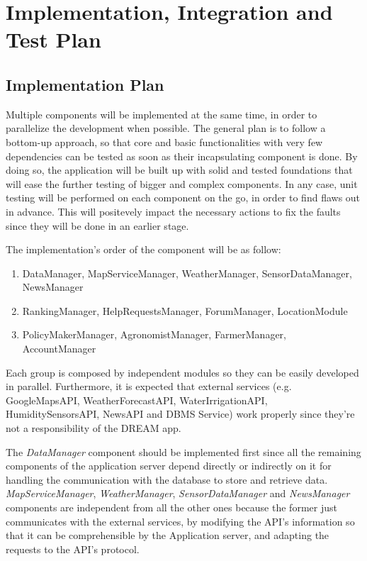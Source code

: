 \documentclass[table, 12pt]{article}
\begin{document}
\section{Implementation, Integration and Test Plan}
\subsection{Implementation Plan}
Multiple components will be implemented at the same time, in order to parallelize the development when possible. The general plan is to follow a bottom-up approach, so that core and basic functionalities with very few dependencies can be tested as soon as their incapsulating component is done. By doing so, the application will be built up with solid and tested foundations that will ease the further testing of bigger and complex components. In any case, unit testing will be performed on each component on the go, in order to find flaws out in advance. This will positevely impact the necessary actions to fix the faults since they will be done in an earlier stage.

The implementation's order of the component will be as follow:
\begin{enumerate}
    \item DataManager, MapServiceManager, WeatherManager, SensorDataManager, NewsManager
    \item RankingManager, HelpRequestsManager, ForumManager, LocationModule
    \item PolicyMakerManager, AgronomistManager, FarmerManager, AccountManager
\end{enumerate}
Each group is composed by independent modules so they can be easily developed in parallel.
Furthermore, it is expected that external services (e.g. GoogleMapsAPI, WeatherForecastAPI, WaterIrrigationAPI, HumiditySensorsAPI, NewsAPI and DBMS Service) work properly since they're not a responsibility of the DREAM app.

The \emph{DataManager} component should be implemented first since all the remaining components of the application server depend directly or indirectly on it for handling the communication with the database to store and retrieve data. \emph{MapServiceManager}, \emph{WeatherManager}, \emph{SensorDataManager} and \emph{NewsManager} components are independent from all the other ones because the former just communicates with the external services, by modifying the API's information so that it can be comprehensible by the Application server, and adapting the requests to the API's protocol.
\end{document}
